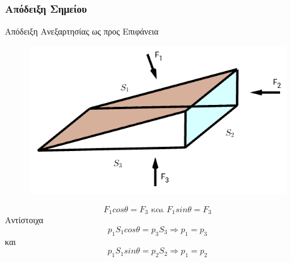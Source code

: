\documentclass[greek]{beamer}
\begin{document}
\subsubsection{Απόδειξη Σημείου}
\begin{frame}{Απόδειξη Ανεξαρτησίας ως προς Επιφάνεια}
  \begin{figure}
    \includegraphics[scale=0.2]{Λευκάδα1}
  \end{figure}
  $$F_1 cosθ = F_3 \text{ και } F_1 sinθ = F_3$$
  Αντίστοιχα
  $$p_1 S_1 cosθ = p_3 S_3 \Rightarrow p_1=p_3$$ και $$p_1 S_1 sinθ = p_2 S_2 \Rightarrow p_1=p_2$$
\end{frame}
\end{document}
